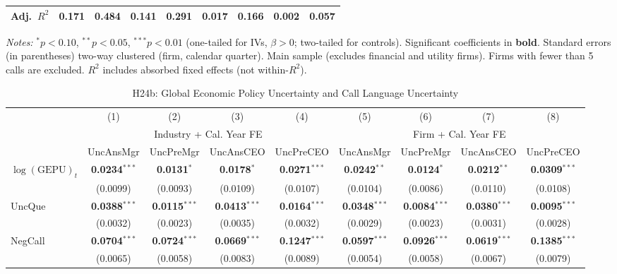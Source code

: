 \documentclass[11pt,a4paper]{article}
\begin{document}
\begin{table}[htbp]
\begin{tabular}{lcccccccc}
Adj.~$R^2$ & 0.171 & 0.484 & 0.141 & 0.291 & 0.017 & 0.166 & 0.002 & 0.057 \\
\bottomrule
\end{tabular}
\begin{minipage}{\linewidth}
\vspace{2pt}\scriptsize
\textit{Notes:} $^{*}p<0.10$, $^{**}p<0.05$, $^{***}p<0.01$ (one-tailed for IVs, $\beta > 0$; two-tailed for controls).
 Significant coefficients in \textbf{bold}.
 Standard errors (in parentheses) two-way clustered (firm, calendar quarter).
 Main sample (excludes financial and utility firms). Firms with fewer than 5 calls are excluded.
 $R^2$ includes absorbed fixed effects (not within-$R^2$).
\end{minipage}
\end{table}
\clearpage
\begin{table}[htbp]
\centering
\caption{H24b: Global Economic Policy Uncertainty and Call Language Uncertainty}
\label{tab:h24b_global_epu}
\scriptsize
\begin{tabular}{lcccccccc}
\toprule
 & (1) & (2) & (3) & (4) & (5) & (6) & (7) & (8) \\
 & \multicolumn{4}{c}{Industry + Cal. Year FE} & \multicolumn{4}{c}{Firm + Cal. Year FE} \\
\cmidrule(lr){2-5} \cmidrule(lr){6-9}
 & UncAnsMgr & UncPreMgr & UncAnsCEO & UncPreCEO & UncAnsMgr & UncPreMgr & UncAnsCEO & UncPreCEO \\
\midrule
$\log(\text{GEPU})_{t}$ & \textbf{0.0234}$^{***}$ & \textbf{0.0131}$^{*}$ & \textbf{0.0178}$^{*}$ & \textbf{0.0271}$^{***}$ & \textbf{0.0242}$^{**}$ & \textbf{0.0124}$^{*}$ & \textbf{0.0212}$^{**}$ & \textbf{0.0309}$^{***}$ \\
 & (0.0099) & (0.0093) & (0.0109) & (0.0107) & (0.0104) & (0.0086) & (0.0110) & (0.0108) \\
\midrule
UncQue & \textbf{0.0388}$^{***}$ & \textbf{0.0115}$^{***}$ & \textbf{0.0413}$^{***}$ & \textbf{0.0164}$^{***}$ & \textbf{0.0348}$^{***}$ & \textbf{0.0084}$^{***}$ & \textbf{0.0380}$^{***}$ & \textbf{0.0095}$^{***}$ \\
 & (0.0032) & (0.0023) & (0.0035) & (0.0032) & (0.0029) & (0.0023) & (0.0031) & (0.0028) \\
NegCall & \textbf{0.0704}$^{***}$ & \textbf{0.0724}$^{***}$ & \textbf{0.0669}$^{***}$ & \textbf{0.1247}$^{***}$ & \textbf{0.0597}$^{***}$ & \textbf{0.0926}$^{***}$ & \textbf{0.0619}$^{***}$ & \textbf{0.1385}$^{***}$ \\
 & (0.0065) & (0.0058) & (0.0083) & (0.0089) & (0.0054) & (0.0058) & (0.0067) & (0.0079) \\

\end{tabular}
\end{table}
\end{document}

